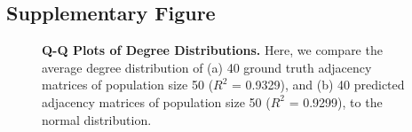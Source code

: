 \documentclass[11pt,titlepage]{article}
\begin{document}
\subsection{Supplementary Figure}
\begin{figure}[H]
\begin{minipage}{0.49\linewidth}
\captionsetup{position=top}
\end{minipage}
\begin{minipage}{0.50\linewidth}
\captionsetup{position=top}
\end{minipage}
\caption[(S1) Q-Q Plots of Degree Distributions]{\textbf{Q-Q Plots of Degree Distributions.} Here, we compare the average degree distribution of (a) 40 ground truth adjacency matrices of population size 50 ($R^2$ = 0.9329), and (b) 40 predicted adjacency matrices of population size 50 ($R^2$ = 0.9299), to the normal distribution.}
\label{fig:QQ}
\end{figure}
\end{document}
